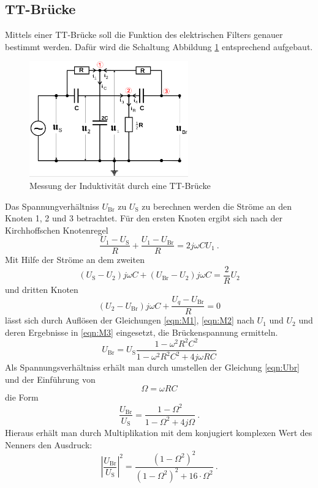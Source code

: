 \subsection{TT-Brücke}
Mittels einer TT-Brücke soll die Funktion des elektrischen Filters genauer bestimmt werden. Dafür wird die Schaltung Abbildung \ref{fig:TT} entsprechend aufgebaut.
\begin{figure}
  \centering
  \includegraphics[height=5cm]{picture/7.png}
  \caption{Messung der Induktivität durch eine TT-Brücke}
  \label{fig:TT}
\end{figure}
Das Spannungverhältniss $U_\text{Br}$ zu $U_\text{S}$ zu berechnen werden die Ströme an den Knoten 1, 2 und 3 betrachtet. Für den ersten Knoten ergibt sich nach der Kirchhoffschen Knotenregel
\begin{equation}
  \frac{U_1 - U_\text{S}}{R} + \frac{U_1 - U_\text{Br}}{R} = 2 j \omega C U_1 \ .
  \label{eqn:M1}
\end{equation}
Mit Hilfe der Ströme an dem zweiten
\begin{equation}
  \left( U_\text{S} - U_2 \right) j \omega C + \left( U_\text{Br} - U_2 \right)j \omega C = \frac{2}{R} U_2
  \label{eqn:M2}
\end{equation}
und dritten Knoten
\begin{equation}
  \left( U_2 - U_\text{Br} \right)j \omega C + \frac{U_q - U_\text{Br}}{R} = 0
  \label{eqn:M3}
\end{equation}
lässt sich durch Auflösen der Gleichungen \ref{eqn:M1}, \ref{eqn:M2} nach $U_1$ und $U_2$ und deren Ergebnisse in \ref{eqn:M3} eingesetzt, die Brückenspannung ermitteln.
\begin{equation}
  U_\text{Br} = U_\text{S} \frac{1 - \omega^2 R^2 C^2}{1 - \omega^2 R^2 C^2 + 4 j \omega R C}
  \label{eqn:Ubr}
\end{equation}
Als Spannungsverhältniss erhält man durch umstellen der Gleichung \ref{eqn:Ubr} und der Einführung von
\begin{equation*}
  \Omega = \omega R C
\end{equation*}
die Form
\begin{equation*}
  \frac{U_\text{Br}}{U_\text{S}} = \frac{1 - \Omega^2}{1 - \Omega^2 + 4 j \Omega} \ .
\end{equation*}
Hieraus erhält man durch Multiplikation mit dem konjugiert komplexen Wert
des Nenners den Ausdruck:
\begin{equation}
  \left| \frac{U_\text{Br}}{U_\text{S}} \right|^2 = \frac{(1 - \Omega^2)^2}{(1 - \Omega^2)^2 + 16 \cdot \Omega^2} \ .
  \label{eqn:BrS}
\end{equation}


